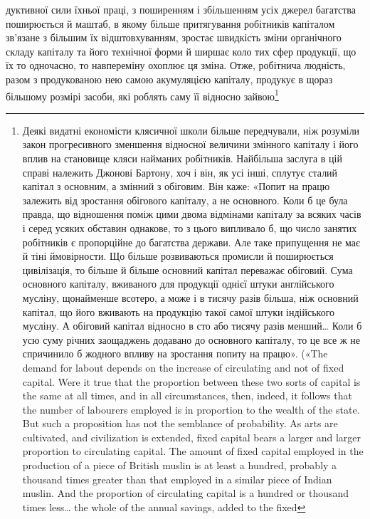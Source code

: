 \parcont{}  %
дуктивної сили їхньої праці, з поширенням і збільшенням усіх
джерел багатства поширюється й маштаб, в якому більше притягування
робітників капіталом зв’язане з більшим їх відштовхуванням,
зростає швидкість зміни органічного складу капіталу
та його технічної форми й ширшає коло тих сфер продукції, що
їх то одночасно, то навпереміну охоплює ця зміна. Отже, робітнича
людність, разом з продукованою нею самою акумуляцією
капіталу, продукує в щораз більшому розмірі засоби, які роблять
саму її відносно зайвою\footnote{
Деякі видатні економісти клясичної школи більше передчували,
ніж розуміли закон прогресивного зменшення відносної величини змінного
капіталу і його вплив на становище кляси найманих робітників.
Найбільша заслуга в цій справі належить Джонові Бартону, хоч і він, як
усі інші, сплутує сталий капітал з основним, а змінний з обіговим. Він
каже: «Попит на працю залежить від зростання обігового капіталу, а
не основного. Коли б це була правда, що відношення поміж цими двома
відмінами капіталу за всяких часів і серед усяких обставин однакове,
то з цього випливало б, що число занятих робітників є пропорційне до
багатства держави. Але таке припущення не має й тіні ймовірности. Що
більше розвиваються промисли й поширюється цивілізація, то більше
й більше основний капітал переважає обіговий. Сума основного капіталу,
вживаного для продукції однієї штуки англійського мусліну, щонайменше
всотеро, а може і в тисячу разів більша, ніж основний капітал, що його
вживають на продукцію такої самої штуки індійського мусліну. А обіговий
капітал відносно в сто або тисячу разів менший\dots{} Коли б усю суму річних
заощаджень додавано до основного капіталу, то це все ж не спричинило
б жодного впливу на зростання попиту на працю». («The demand for
labout depends on the increase of circulating and not of fixed capital. Were
it true that the proportion between these two sorts of capital is the same at
all times, and in all circumstances, then, indeed, it follows that the number
of labourers employed is in proportion to the wealth of the state.
But such a proposition has not the semblance of probability. As arts are
cultivated, and civilization is extended, fixed capital bears a larger and
larger proportion to circulating capital. The amount of fixed capital employed
in the production of a piece of British muslin is at least a hundred, probably
a thousand times greater than that employed in a similar piece of
Indian muslin. And the proportion of circulating capital is a hundred or thousand times less\dots{} the whole of the annual savings, added to the fixed
}
